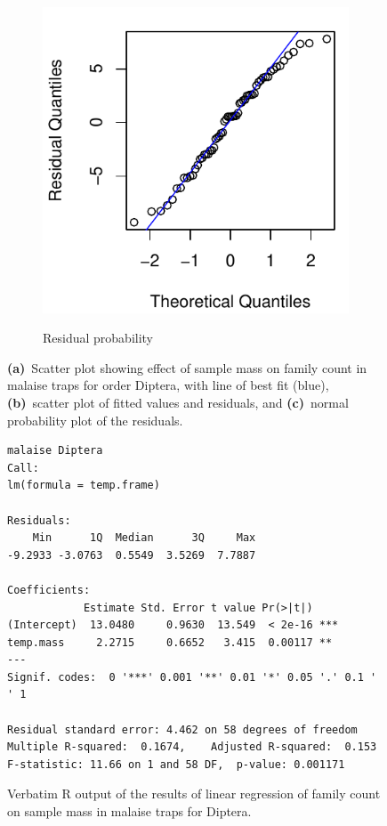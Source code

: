 \documentclass[10pt,letterpaper,twocolumn]{article}
\begin{document}
\begin{figure}[h]
\begin{subfigure}[b]{0.15\textwidth}
		\label{fig:malaise_diptera_resid}
	\end{subfigure}
	~
	\begin{subfigure}[b]{0.15\textwidth}
		\caption{Residual probability}
		\includegraphics[width=\textwidth]{plots/mass-vs-count/qqplot/2015_malaise_Diptera_qqplot.pdf}
		\label{fig:malaise_diptera_qqplot}
	\end{subfigure}
	\caption{\textbf{(a)}~Scatter plot showing effect of sample mass on family count in malaise traps for order Diptera, with line of best fit (blue), \textbf{(b)}~scatter plot of fitted values and residuals, and \textbf{(c)}~normal probability plot of the residuals.}
	\label{fig:malaise_diptera}
	\smallskip
	\nointerlineskip
	\hrulefill
\end{figure}

\begin{figure}[h]
	\lstset{numbers=left}
	\lstset{xleftmargin=5mm,framexleftmargin=5mm}
	\begin{lstlisting}
malaise Diptera
Call:
lm(formula = temp.frame)

Residuals:
    Min      1Q  Median      3Q     Max 
-9.2933 -3.0763  0.5549  3.5269  7.7887 

Coefficients:
            Estimate Std. Error t value Pr(>|t|)    
(Intercept)  13.0480     0.9630  13.549  < 2e-16 ***
temp.mass     2.2715     0.6652   3.415  0.00117 ** 
---
Signif. codes:  0 '***' 0.001 '**' 0.01 '*' 0.05 '.' 0.1 ' ' 1

Residual standard error: 4.462 on 58 degrees of freedom
Multiple R-squared:  0.1674,	Adjusted R-squared:  0.153 
F-statistic: 11.66 on 1 and 58 DF,  p-value: 0.001171
	\end{lstlisting}
	\caption{Verbatim R output of the results of linear regression of family count on sample mass in malaise traps for Diptera.}
	\label{fig:malaise_diptera_regression}
	\smallskip
	\nointerlineskip
	\hrulefill
\end{figure}
\end{document}

